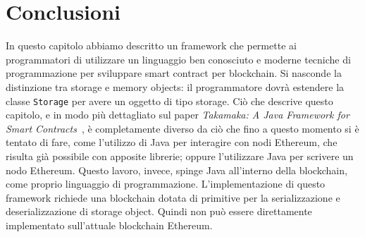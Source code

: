 \section{Conclusioni} \label{takamaka:conclusioni}
In questo capitolo abbiamo descritto un framework che permette ai programmatori di utilizzare un linguaggio ben conosciuto e moderne tecniche di programmazione per sviluppare smart contract per blockchain. Si nasconde la distinzione tra storage e memory objects: il programmatore dovrà estendere la classe \lstinline|Storage| per avere un oggetto di tipo storage. Ciò che descrive questo capitolo, e in modo più dettagliato sul paper \textit{Takamaka: A Java Framework for Smart Contracts}~\cite{paper-takamaka:spoto}, è completamente diverso da ciò che fino a questo momento si è tentato di fare, come l'utilizzo di Java per interagire con nodi Ethereum, che risulta già possibile con apposite librerie; oppure l'utilizzare Java per scrivere un nodo Ethereum. Questo lavoro, invece, spinge Java all'interno della blockchain, come proprio linguaggio di programmazione. L'implementazione di questo framework richiede una blockchain dotata di primitive per la serializzazione e deserializzazione di storage object. Quindi non può essere direttamente implementato sull'attuale blockchain Ethereum.
